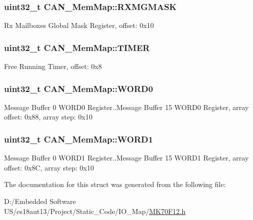 \subsubsection[{R\+X\+M\+G\+M\+A\+S\+K}]{\setlength{\rightskip}{0pt plus 5cm}uint32\+\_\+t C\+A\+N\+\_\+\+Mem\+Map\+::\+R\+X\+M\+G\+M\+A\+S\+K}\label{struct_c_a_n___mem_map_aa788d49d34c42aeb411ed6b43f1a7c42}
Rx Mailboxes Global Mask Register, offset\+: 0x10 \hypertarget{struct_c_a_n___mem_map_a7cdd012a6030c4bf528cec65fddb71ca}{}
\subsubsection[{T\+I\+M\+E\+R}]{\setlength{\rightskip}{0pt plus 5cm}uint32\+\_\+t C\+A\+N\+\_\+\+Mem\+Map\+::\+T\+I\+M\+E\+R}\label{struct_c_a_n___mem_map_a7cdd012a6030c4bf528cec65fddb71ca}
Free Running Timer, offset\+: 0x8 \hypertarget{struct_c_a_n___mem_map_ac2b68cfbc9aeab141d20ae8bd73cd169}{}
\subsubsection[{W\+O\+R\+D0}]{\setlength{\rightskip}{0pt plus 5cm}uint32\+\_\+t C\+A\+N\+\_\+\+Mem\+Map\+::\+W\+O\+R\+D0}\label{struct_c_a_n___mem_map_ac2b68cfbc9aeab141d20ae8bd73cd169}
Message Buffer 0 W\+O\+R\+D0 Register..Message Buffer 15 W\+O\+R\+D0 Register, array offset\+: 0x88, array step\+: 0x10 \hypertarget{struct_c_a_n___mem_map_ae9343e0c532c0f3784d9960ffb8aa229}{}
\subsubsection[{W\+O\+R\+D1}]{\setlength{\rightskip}{0pt plus 5cm}uint32\+\_\+t C\+A\+N\+\_\+\+Mem\+Map\+::\+W\+O\+R\+D1}\label{struct_c_a_n___mem_map_ae9343e0c532c0f3784d9960ffb8aa229}
Message Buffer 0 W\+O\+R\+D1 Register..Message Buffer 15 W\+O\+R\+D1 Register, array offset\+: 0x8\+C, array step\+: 0x10 

The documentation for this struct was generated from the following file\+:\begin{DoxyCompactItemize}
\item 
D\+:/\+Embedded Software U\+S/es18aut13/\+Project/\+Static\+\_\+\+Code/\+I\+O\+\_\+\+Map/\hyperlink{_m_k70_f12_8h}{M\+K70\+F12.\+h}\end{DoxyCompactItemize}
